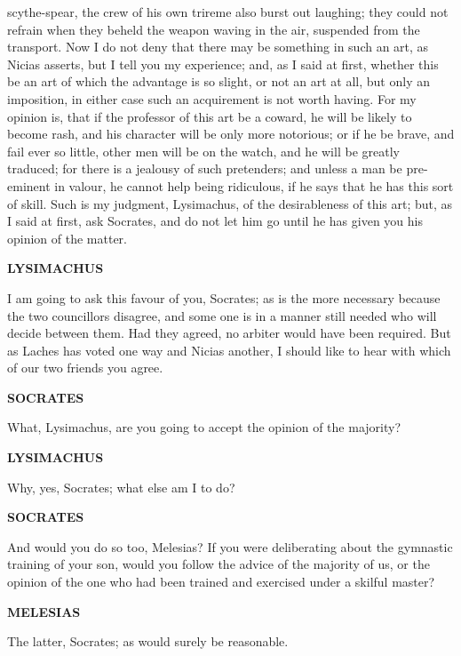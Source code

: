 \documentclass[11pt,letter]{article}
\begin{document}
scythe-spear, the crew of his own trireme also burst out laughing; they could not refrain when they beheld the weapon waving in the air, suspended from the transport. Now I do not deny that there may be something in such an art, as Nicias asserts, but I tell you my experience; and, as I said at first, whether this be an art of which the advantage is so slight, or not an art at all, but only an imposition, in either case such an acquirement is not worth having. For my opinion is, that if the professor of this art be a coward, he will be likely to become rash, and his character will be only more notorious; or if he be brave, and fail ever so little, other men will be on the watch, and he will be greatly traduced; for there is a jealousy of such pretenders; and unless a man be pre-eminent in valour, he cannot help being ridiculous, if he says that he has this sort of skill. Such is my judgment, Lysimachus, of the desirableness of this art; but, as I said at first, ask Socrates, and do not let him go until he has given you his opinion of the matter.

\par \textbf{LYSIMACHUS}
\par   I am going to ask this favour of you, Socrates; as is the more necessary because the two councillors disagree, and some one is in a manner still needed who will decide between them. Had they agreed, no arbiter would have been required. But as Laches has voted one way and Nicias another, I should like to hear with which of our two friends you agree.

\par \textbf{SOCRATES}
\par   What, Lysimachus, are you going to accept the opinion of the majority?

\par \textbf{LYSIMACHUS}
\par   Why, yes, Socrates; what else am I to do?

\par \textbf{SOCRATES}
\par   And would you do so too, Melesias? If you were deliberating about the gymnastic training of your son, would you follow the advice of the majority of us, or the opinion of the one who had been trained and exercised under a skilful master?

\par \textbf{MELESIAS}
\par   The latter, Socrates; as would surely be reasonable.
\end{document}
